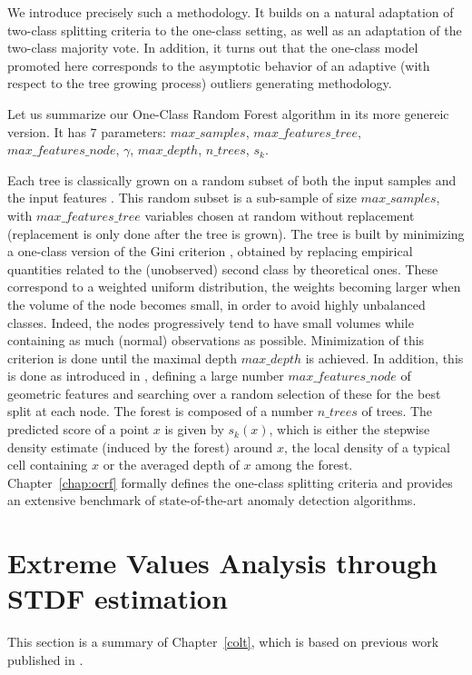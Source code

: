 We introduce precisely such a methodology. It builds on a natural adaptation of two-class %
splitting criteria to the one-class setting, as well as an adaptation of the two-class majority vote.
In addition, it turns out that the one-class model promoted here corresponds to the asymptotic behavior of an adaptive (with respect to the tree growing process) outliers generating methodology.


Let us summarize our One-Class Random Forest algorithm in its more genereic version. %
It has $7$ parameters:
$max\_samples$, $max\_features\_tree$, $max\_features\_node$, $\gamma$, $max\_depth$, $n\_trees$, $s_k$.

Each tree is classically grown on a random subset of both the input samples and the input features \citep{Ho1998, Panov2007}.
This random subset is a sub-sample of size $max\_samples$, with $max\_features\_tree$ variables chosen at random without replacement (replacement is only done after the tree is grown). The tree is built by minimizing 
a one-class version of the Gini criterion \citep{Gini1912}, obtained by replacing empirical quantities related to the (unobserved) second class by theoretical ones. These correspond to a weighted uniform distribution, the weights becoming larger when the volume of the node becomes small, in order to avoid highly unbalanced classes. Indeed, the nodes progressively tend to have small volumes while containing as much (normal) observations as possible.
%
Minimization of this criterion is done until the maximal depth $max\_depth$ is achieved.
In addition, this is done as introduced in \citep{Amit1997}, defining a large number $max\_features\_node$ of geometric features and searching over a random selection of these for the best split at each node.
%
The forest is composed of a number $n\_trees$ of trees. The predicted score of a point $x$ is given by $s_k(x)$, which is either the stepwise density estimate (induced by the forest) around $x$, the local density of a typical cell containing $x$ or the averaged depth of $x$ among the forest. Chapter~\ref{chap:ocrf} formally defines the one-class splitting criteria and provides an extensive benchmark of state-of-the-art anomaly detection algorithms.




\section{Extreme Values Analysis through STDF estimation}
\label{resume:stdf}
This section is a summary of Chapter~\ref{colt}, which is based on previous work published in \cite{COLT15}.

